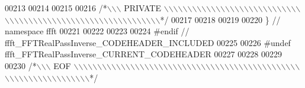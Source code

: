 \begin{DoxyCode}
00213 
00214 
00215 
00216 \textcolor{comment}{/*\(\backslash\)\(\backslash\)\(\backslash\) PRIVATE \(\backslash\)\(\backslash\)\(\backslash\)\(\backslash\)\(\backslash\)\(\backslash\)\(\backslash\)\(\backslash\)\(\backslash\)\(\backslash\)\(\backslash\)\(\backslash\)\(\backslash\)\(\backslash\)\(\backslash\)\(\backslash\)\(\backslash\)\(\backslash\)\(\backslash\)\(\backslash\)\(\backslash\)\(\backslash\)\(\backslash\)\(\backslash\)\(\backslash\)\(\backslash\)\(\backslash\)\(\backslash\)\(\backslash\)\(\backslash\)\(\backslash\)\(\backslash\)\(\backslash\)\(\backslash\)\(\backslash\)\(\backslash\)\(\backslash\)\(\backslash\)\(\backslash\)\(\backslash\)\(\backslash\)\(\backslash\)\(\backslash\)\(\backslash\)\(\backslash\)\(\backslash\)\(\backslash\)\(\backslash\)\(\backslash\)\(\backslash\)\(\backslash\)\(\backslash\)\(\backslash\)\(\backslash\)\(\backslash\)\(\backslash\)\(\backslash\)\(\backslash\)\(\backslash\)\(\backslash\)\(\backslash\)\(\backslash\)*/}
00217 
00218 
00219 
00220 \}   \textcolor{comment}{// namespace ffft}
00221 
00222 
00223 
00224 \textcolor{preprocessor}{#endif  // ffft\_FFTRealPassInverse\_CODEHEADER\_INCLUDED}
00225 
00226 \textcolor{preprocessor}{#undef ffft\_FFTRealPassInverse\_CURRENT\_CODEHEADER}
00227 
00228 
00229 
00230 \textcolor{comment}{/*\(\backslash\)\(\backslash\)\(\backslash\) EOF \(\backslash\)\(\backslash\)\(\backslash\)\(\backslash\)\(\backslash\)\(\backslash\)\(\backslash\)\(\backslash\)\(\backslash\)\(\backslash\)\(\backslash\)\(\backslash\)\(\backslash\)\(\backslash\)\(\backslash\)\(\backslash\)\(\backslash\)\(\backslash\)\(\backslash\)\(\backslash\)\(\backslash\)\(\backslash\)\(\backslash\)\(\backslash\)\(\backslash\)\(\backslash\)\(\backslash\)\(\backslash\)\(\backslash\)\(\backslash\)\(\backslash\)\(\backslash\)\(\backslash\)\(\backslash\)\(\backslash\)\(\backslash\)\(\backslash\)\(\backslash\)\(\backslash\)\(\backslash\)\(\backslash\)\(\backslash\)\(\backslash\)\(\backslash\)\(\backslash\)\(\backslash\)\(\backslash\)\(\backslash\)\(\backslash\)\(\backslash\)\(\backslash\)\(\backslash\)\(\backslash\)\(\backslash\)\(\backslash\)\(\backslash\)\(\backslash\)\(\backslash\)\(\backslash\)\(\backslash\)\(\backslash\)\(\backslash\)\(\backslash\)\(\backslash\)\(\backslash\)\(\backslash\)*/}
\end{DoxyCode}
